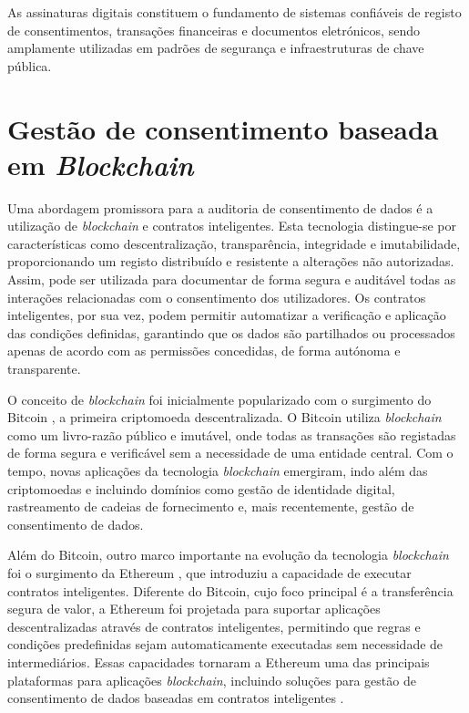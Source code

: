 As assinaturas digitais constituem o fundamento de sistemas confiáveis de registo de consentimentos, transações financeiras e documentos eletrónicos, sendo amplamente utilizadas em padrões de segurança e infraestruturas de chave pública.


\section{Gestão de consentimento baseada em \textit{{Blockchain}}}

Uma abordagem promissora para a auditoria de consentimento de dados é a utilização de \textit{blockchain} e contratos inteligentes. Esta tecnologia distingue-se por características como descentralização, transparência, integridade e imutabilidade, proporcionando um registo distribuído e resistente a alterações não autorizadas. Assim, pode ser utilizada para documentar de forma segura e auditável todas as interações relacionadas com o consentimento dos utilizadores. Os contratos inteligentes, por sua vez, podem permitir automatizar a verificação e aplicação das condições definidas, garantindo que os dados são partilhados ou processados apenas de acordo com as permissões concedidas, de forma autónoma e transparente.

O conceito de \textit{blockchain} foi inicialmente popularizado com o surgimento do Bitcoin \citep{nakamoto2008bitcoin}, a primeira criptomoeda descentralizada. O Bitcoin utiliza \textit{blockchain} como um livro-razão público e imutável, onde todas as transações são registadas de forma segura e verificável sem a necessidade de uma entidade central. Com o tempo, novas aplicações da tecnologia \textit{blockchain} emergiram, indo além das criptomoedas e incluindo domínios como gestão de identidade digital, rastreamento de cadeias de fornecimento e, mais recentemente, gestão de consentimento de dados.

Além do Bitcoin, outro marco importante na evolução da tecnologia \textit{blockchain} foi o surgimento da Ethereum \citep{buterin2014next}, que introduziu a capacidade de executar contratos inteligentes. Diferente do Bitcoin, cujo foco principal é a transferência segura de valor, a Ethereum foi projetada para suportar aplicações descentralizadas através de contratos inteligentes, permitindo que regras e condições predefinidas sejam automaticamente executadas sem necessidade de intermediários. Essas capacidades tornaram a Ethereum uma das principais plataformas para aplicações \textit{blockchain}, incluindo soluções para gestão de consentimento de dados baseadas em contratos inteligentes \citep{Frank2018}.


